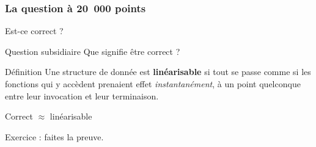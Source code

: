 \documentclass[xcolor={x11names,svgnames}]{beamer}
\begin{document}

\begin{frame}[label=lf_intset]
  \frametitle{La question à 20\ 000 points}

  {\Huge Est-ce correct ?}

  \bigskip\pause

  \begin{alertblock}{Question subsidiaire}
    Que signifie \og être correct\fg{} ?
  \end{alertblock}

  \bigskip\pause
  
  \begin{exampleblock}{Définition}
    Une structure de donnée est \textbf{linéarisable} si tout se passe comme si les
    fonctions qui y accèdent prenaient effet \emph{instantanément}, à un point
    quelconque entre leur invocation et leur terminaison.
  \end{exampleblock}

  \bigskip\pause

  Correct $\approx$ linéarisable

  \bigskip\pause

  Exercice : faites la preuve.
\end{frame}


\end{document}
